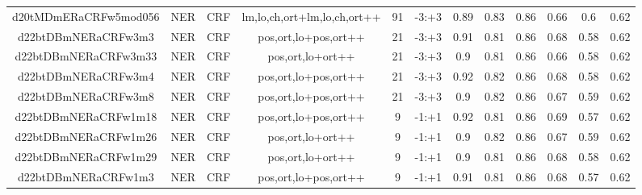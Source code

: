 \documentclass[a4paper]{article}
\begin{document}
\begin{landscape}
\begin{center}
\begin{tabular}{ |c|c|c|c|c|c|c|c|c|c|c|c|}
 
 	
 	\small{ d20tMDmERaCRFw5mod056 } & \small{ NER} & \small{  CRF }  & lm,lo,ch,ort+lm,lo,ch,ort++  &  91 &  \small{  -3:+3 }  &  0.89 & 0.83 & 0.86  &  0.66 & 0.6 & 0.62 \\
 	

 
 	
 	\small{ d22btDBmNERaCRFw3m3 } & \small{ NER} & \small{  CRF }  & pos,ort,lo+pos,ort++  &  21 &  \small{  -3:+3 }  &  0.91 & 0.81 & 0.86  &  0.68 & 0.58 & 0.62 \\
 	

 
 	
 	\small{ d22btDBmNERaCRFw3m33 } & \small{ NER} & \small{  CRF }  & pos,ort,lo+ort++  &  21 &  \small{  -3:+3 }  &  0.9 & 0.81 & 0.86  &  0.66 & 0.58 & 0.62 \\
 	

 
 	
 	\small{ d22btDBmNERaCRFw3m4 } & \small{ NER} & \small{  CRF }  & pos,ort,lo+pos,ort++  &  21 &  \small{  -3:+3 }  &  0.92 & 0.82 & 0.86  &  0.68 & 0.58 & 0.62 \\
 	

 
 	
 	\small{ d22btDBmNERaCRFw3m8 } & \small{ NER} & \small{  CRF }  & pos,ort,lo+pos,ort++  &  21 &  \small{  -3:+3 }  &  0.9 & 0.82 & 0.86  &  0.67 & 0.59 & 0.62 \\
 	

 
 	
 	\small{ d22btDBmNERaCRFw1m18 } & \small{ NER} & \small{  CRF }  & pos,ort,lo+pos,ort++  &  9 &  \small{  -1:+1 }  &  0.92 & 0.81 & 0.86  &  0.69 & 0.57 & 0.62 \\
 	

 
 	
 	\small{ d22btDBmNERaCRFw1m26 } & \small{ NER} & \small{  CRF }  & pos,ort,lo+ort++  &  9 &  \small{  -1:+1 }  &  0.9 & 0.82 & 0.86  &  0.67 & 0.59 & 0.62 \\
 	

 
 	
 	\small{ d22btDBmNERaCRFw1m29 } & \small{ NER} & \small{  CRF }  & pos,ort,lo+ort++  &  9 &  \small{  -1:+1 }  &  0.9 & 0.81 & 0.86  &  0.68 & 0.58 & 0.62 \\
 	

 
 	
 	\small{ d22btDBmNERaCRFw1m3 } & \small{ NER} & \small{  CRF }  & pos,ort,lo+pos,ort++  &  9 &  \small{  -1:+1 }  &  0.91 & 0.81 & 0.86  &  0.68 & 0.57 & 0.62 \\
 	


\end{tabular}
\end{center}
\end{landscape}
\end{document}
